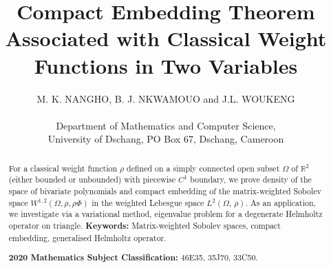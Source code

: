 \documentclass[11pt]{article}
\begin{document}
	
	\title{Compact Embedding Theorem Associated with Classical Weight Functions in Two Variables}
\author{M. K. NANGHO, B. J. NKWAMOUO and J.L. WOUKENG \\
			\\
			Department of Mathematics and Computer Science,\\ University of Dschang, PO Box 67, Dschang, Cameroon } 
	\maketitle
	
	
		\begin{abstract}
		For a classical weight function $\rho$ defined on a simply connected open subset $\Omega$ of $\mathbb{R}^2$ (either bounded or unbounded) with piecewise $C^1$ boundary, we prove density of the space of bivariate polynomials and compact embedding of the matrix-weighted Sobolev space $W^{1,2}(\Omega,\rho,\rho\Phi)$ in the weighted Lebesgue space   $L^2(\Omega,\, \rho)$. As an application, we investigate via a variational method, eigenvalue problem for a degenerate Helmholtz operator on  triangle.
		\vspace{5pt}
		\newline
		\textbf{Keywords: }{Matrix-weighted Sobolev spaces, compact embedding, generalised Helmholtz operator.}
		
		\vspace{5pt}
		\noindent
		\textbf{2020 Mathematics Subject Classification:}  46E35, 35J70, 33C50.
	\end{abstract}
	
\maketitle
\pagestyle{myheadings}
	
	
\end{document}
